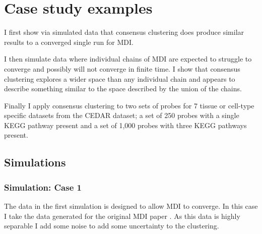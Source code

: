 \documentclass[12pt]{article} %
\begin{document}
	
	
	

	

	\section{Case study examples}
	I first show via simulated data that consensus clustering does produce similar results to a converged single run for MDI.
	
	I then simulate data where individual chains of MDI are expected to struggle to converge and possibly will not converge in finite time. I show that consensus clustering explores a wider space than any individual chain and appears to describe something similar to the space described by the union of the chains.
	
	Finally I apply consensus clustering to two sets of probes for 7 tissue or cell-type specific datasets from the CEDAR dataset; a set of 250 probes with a single KEGG pathway present and a set of 1,000 probes with three KEGG pathways present.
	
	\subsection{Simulations}
	\subsubsection{Simulation: Case 1} \label{sec:sim:data:case_1}
	The data in the first simulation is designed to allow MDI to converge. In this case I take the data generated for the original MDI paper \cite{KirkBayesiancorrelatedclustering2012}. As this data is highly separable I add some noise to add some uncertainty to the clustering. 
	
\end{document}
